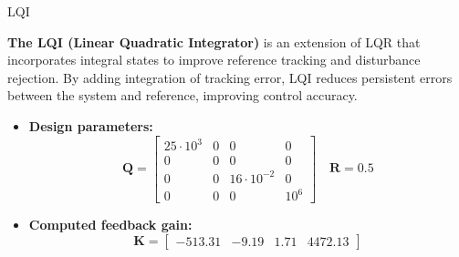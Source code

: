 \begin{frame}{LQI}

    \textbf{The LQI (Linear Quadratic Integrator)} is an extension of LQR that incorporates integral states to improve reference tracking and disturbance rejection.
    By adding integration of tracking error, LQI reduces persistent errors between the system and reference, improving control accuracy.

    \begin{itemize}
        \item \textbf{Design parameters:}
              \begin{equation}
                  \mathbf{Q} = \begin{bmatrix}
                      25\cdot10^3 & 0 & 0              & 0    \\
                      0           & 0 & 0              & 0    \\
                      0           & 0 & 16\cdot10^{-2} & 0    \\
                      0           & 0 & 0              & 10^6
                  \end{bmatrix} \quad \mathbf{R} = 0.5
              \end{equation}
        \item \textbf{Computed feedback gain:}
              \begin{equation}
                  \mathbf{K} = \begin{bmatrix}
                      -513.31 & -9.19 & 1.71 & 4472.13
                  \end{bmatrix}
              \end{equation}
    \end{itemize}
\end{frame}



